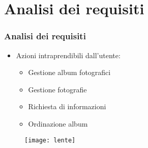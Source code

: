 
\section{Analisi dei requisiti}
\begin{frame}

  \frametitle{Analisi dei requisiti}

  \begin{itemize}
  \item Azioni intraprendibili dall'utente:
    \begin{itemize}
    \item Gestione album fotografici
    \item Gestione fotografie
    \item Richiesta di informazioni
    \item Ordinazione album
    \end{itemize}
  \end{itemize}

  \begin{figure}[H]
    \centering
    \texttt{[image: lente]}
  \end{figure}
\end{frame}
